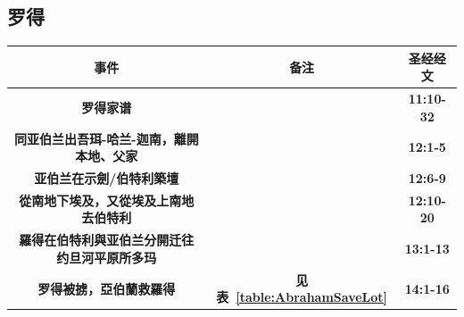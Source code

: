 \subsection{罗得}
\begin{table}[!hbp]
\begin{threeparttable}
\begin{tabular}{c c c}
\toprule
 \multicolumn{1}{L{\dimexpr0.5\linewidth-1\tabcolsep\relax}}{\bfseries 事件} 
&\multicolumn{1}{L{\dimexpr0.2\linewidth-1\tabcolsep\relax}}{\bfseries 备注}   
&\multicolumn{1}{L{\dimexpr0.1\linewidth-1\tabcolsep\relax}}{\bfseries 圣经经文}\\\hline

\multicolumn{1}{L{\dimexpr0.5\linewidth-1\tabcolsep\relax}}{\bfseries 罗得家谱}  
& \multicolumn{1}{L{\dimexpr0.1\linewidth-1\tabcolsep\relax}}{\bfseries  }
& \multicolumn{1}{L{\dimexpr0.1\linewidth-1\tabcolsep\relax}}{\bfseries 11:10-32}\\ 

\multicolumn{1}{L{\dimexpr0.5\linewidth-1\tabcolsep\relax}}{\bfseries 同亚伯兰出吾珥-哈兰-迦南，離開本地、父家} 
& \multicolumn{1}{L{\dimexpr0.1\linewidth-1\tabcolsep\relax}}{\bfseries } 
& \multicolumn{1}{L{\dimexpr0.1\linewidth-1\tabcolsep\relax}}{\bfseries 12:1-5}\\ 

\multicolumn{1}{L{\dimexpr0.5\linewidth-1\tabcolsep\relax}}{\bfseries 亚伯兰在示劍/伯特利築壇} 
& \multicolumn{1}{L{\dimexpr0.1\linewidth-1\tabcolsep\relax}}{\bfseries }  
& \multicolumn{1}{L{\dimexpr0.1\linewidth-1\tabcolsep\relax}}{\bfseries 12:6-9}\\

\multicolumn{1}{L{\dimexpr0.5\linewidth-1\tabcolsep\relax}}{\bfseries 從南地下埃及，又從埃及上南地去伯特利} 
& \multicolumn{1}{L{\dimexpr0.1\linewidth-1\tabcolsep\relax}}{\bfseries }   
& \multicolumn{1}{L{\dimexpr0.1\linewidth-1\tabcolsep\relax}}{\bfseries 12:10-20}\\

\multicolumn{1}{L{\dimexpr0.5\linewidth-1\tabcolsep\relax}}{\bfseries 羅得在伯特利與亚伯兰分開迁往约旦河平原所多玛} 
& \multicolumn{1}{L{\dimexpr0.1\linewidth-1\tabcolsep\relax}}{\bfseries } 
& \multicolumn{1}{L{\dimexpr0.1\linewidth-1\tabcolsep\relax}}{\bfseries 13:1-13}\\\hline

\multicolumn{1}{L{\dimexpr0.5\linewidth-1\tabcolsep\relax}}{\bfseries 罗得被掳，亞伯蘭救羅得} 
& \multicolumn{1}{L{\dimexpr0.1\linewidth-1\tabcolsep\relax}}{\bfseries 见表~\ref{table:AbrahamSaveLot}}  
& \multicolumn{1}{L{\dimexpr0.1\linewidth-1\tabcolsep\relax}}{\bfseries 14:1-16}\\


\end{tabular}
\end{threeparttable}
\end{table}
